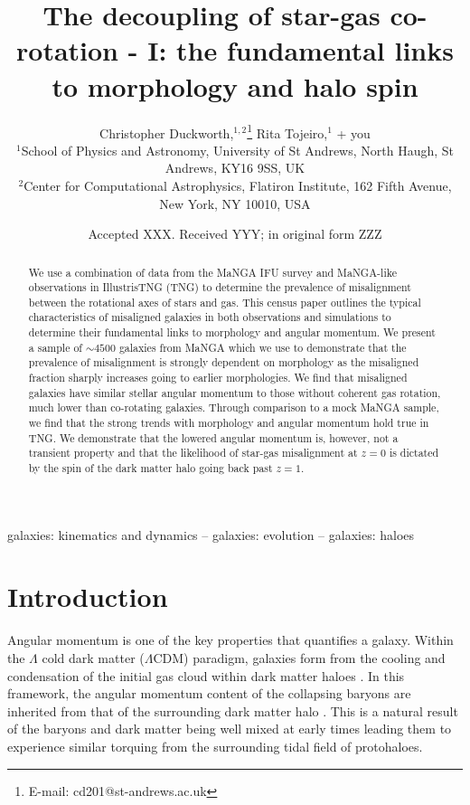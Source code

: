 \documentclass[fleqn,usenatbib]{mnras}
\title[The decoupling of star-gas co-rotation - I]{The decoupling of star-gas co-rotation - I: the fundamental links to morphology and halo spin}
\author[C. Duckworth et al.]{Christopher Duckworth,$^{1,2}$\thanks{E-mail: cd201@st-andrews.ac.uk}
Rita Tojeiro,$^{1}$
+ you
\\
{}$^{1}$School of Physics and Astronomy, University of St Andrews, North Haugh, St Andrews, KY16 9SS, UK\\
$^{2}$Center for Computational Astrophysics, Flatiron Institute, 162 Fifth Avenue, New York, NY 10010, USA\\
}
\date{Accepted XXX. Received YYY; in original form ZZZ}
\begin{document}
\label{firstpage}
\pagerange{\pageref{firstpage}--\pageref{lastpage}}
\maketitle

\begin{abstract}
We use a combination of data from the MaNGA IFU survey and MaNGA-like observations in IllustrisTNG (TNG) to determine the prevalence of misalignment between the rotational axes of stars and gas. This census paper outlines the typical characteristics of misaligned galaxies in both observations and simulations to determine their fundamental links to morphology and angular momentum. We present a sample of $\sim 4500$ galaxies from MaNGA which we use to demonstrate that the prevalence of misalignment is strongly dependent on morphology as the misaligned fraction sharply increases going to earlier morphologies. We find that misaligned galaxies have similar stellar angular momentum to those without coherent gas rotation, much lower than co-rotating galaxies. Through comparison to a mock MaNGA sample, we find that the strong trends with morphology and angular momentum hold true in TNG. 
We demonstrate that the lowered angular momentum is, however, not a transient property and that the likelihood of star-gas misalignment at $z = 0$ is dictated by the spin of the dark matter halo going back past $z = 1$. 
\end{abstract}

\begin{keywords}
galaxies: kinematics and dynamics -- galaxies: evolution -- galaxies: haloes
\end{keywords}
\section{Introduction}
Angular momentum is one of the key properties that quantifies a galaxy. Within the $\Lambda$ cold dark matter ($\Lambda$CDM) paradigm, galaxies form from the cooling and condensation of the initial gas cloud within dark matter haloes \citep{fall1980, mo1998}. In this framework, the angular momentum content of the collapsing baryons are inherited from that of the surrounding dark matter halo \citep[tidal torque theory (TTT); e.g.][]{hoyle1951, peebles1969, Doroshkevich1970}. This is a natural result of the baryons and dark matter being well mixed at early times leading them to experience similar torquing from the surrounding tidal field of protohaloes. 
\end{document}
